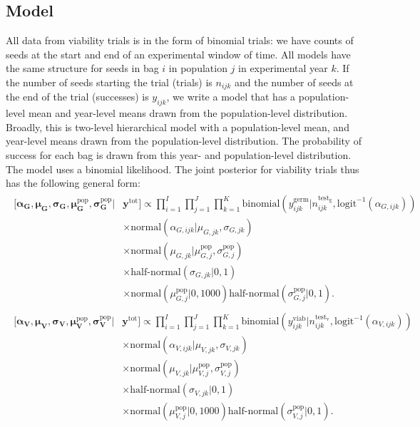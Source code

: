 \documentclass[12pt, oneside, titlepage]{article}   	%
\begin{document}
\subsection{Model}

All data from viability trials is in the form of binomial trials: we have counts of seeds at the start and end of an experimental window of time. All models have the same structure for seeds in bag $i$ in population $j$ in experimental year $k$. If the number of seeds starting the trial (trials) is $n_{ijk}$ and the number of seeds at the end of the trial (successes) is $y_{ijk}$, we write a model that has a population-level mean and year-level means drawn from the population-level distribution. Broadly, this is two-level hierarchical model with a population-level mean, and year-level means drawn from the population-level distribution. The probability of success for each bag is drawn from this year- and population-level distribution. The model uses a binomial likelihood. The joint posterior for viability trials thus has the following general form:
%
\begin{align}
  \begin{split}
 [  \bm{\alpha_G} , \bm{\mu_G} , \bm{\sigma_G} , \bm{\mu^\mathrm{pop}_G}, \bm{\sigma^\mathrm{pop}_G} | & \bm{y^{\mathrm{tot}}}  ] \propto \prod_{i=1}^{I}   \prod_{j=1}^{J}  \prod_{k=1}^{K} 
   \mathrm{binomial} ( y^{\mathrm{germ}}_{ijk} | n^\mathrm{test_g}_{ijk}, \mathrm{logit}^{-1}( \alpha_{G,ijk} ) ) 
   \\ & \times \mathrm{normal} ( \alpha_{G,ijk}  | \mu_{G,jk}, \sigma{_{G,jk} })
  \\ & \times \mathrm{normal} ( \mu_{G,jk}  | \mu^\mathrm{pop}_{G,j}, \sigma^\mathrm{pop}_{G,j} )
  \\ & \times \textrm{half-normal} ( \sigma_{G,jk} | 0,1)
  \\ & \times \mathrm{normal} ( \mu^\mathrm{pop}_{G,j} | 0 , 1000 ) \textrm{half-normal} ( \sigma^\mathrm{pop}_{G,j} | 0,1).
  \end{split}
\end{align}
%
\begin{align}
  \begin{split}
 [  \bm{\alpha_V} , \bm{\mu_V} , \bm{\sigma_V} , \bm{\mu^\mathrm{pop}_V}, \bm{\sigma^\mathrm{pop}_V} | & \bm{y^{\mathrm{tot}}}  ] \propto \prod_{i=1}^{I}   \prod_{j=1}^{J}  \prod_{k=1}^{K} 
   \mathrm{binomial} ( y^{\mathrm{viab}}_{ijk} | n^\mathrm{test_v}_{ijk}, \mathrm{logit}^{-1}( \alpha_{V,ijk} ) ) 
   \\ & \times \mathrm{normal} ( \alpha_{V,ijk}  | \mu_{V,jk}, \sigma{_{V,jk} })
  \\ & \times \mathrm{normal} ( \mu_{V,jk}  | \mu^\mathrm{pop}_{V,j}, \sigma^\mathrm{pop}_{V,j} )
  \\ & \times \textrm{half-normal} ( \sigma_{V,jk} | 0,1)
  \\ & \times \mathrm{normal} ( \mu^\mathrm{pop}_{V,j} | 0 , 1000 ) \textrm{half-normal} ( \sigma^\mathrm{pop}_{V,j} | 0,1).
  \end{split}
\end{align}
\end{document}
